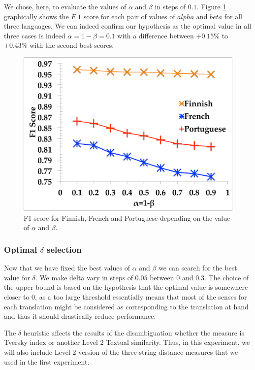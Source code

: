 \documentclass[10pt,a4paper,twoside]{article}
\begin{document}
We chose, here, to evaluate the values of \(\alpha\) and \(\beta\) in steps of \(0.1\). Figure \ref{fig.1} graphically shows the \(F\_1\) score for each pair of values of \(alpha\) and \(beta\) for all three languages. We can indeed confirm our hypothesis as the optimal value in all three cases is indeed \(\alpha=1-\beta=0.1\) with a difference between \(+0.15\%\) to \(+0.43\%\) with the second best scores.
	
\begin{figure}\centering
\includegraphics[width=0.64\columnwidth]{alphabetafig}
\caption{F1 score for Finnish, French and Portuguese depending on the value of \(\alpha\) and \(\beta\).}
\label{fig.1}
\end{figure}

\subsubsection{Optimal \(\delta\) selection}
Now that we have fixed the best values of \(\alpha\) and \(\beta\) we can search for the best value for \(\delta\). We make delta vary in steps of \(0.05\) between \(0\) and \(0.3\). The choice of the upper bound is based on the hypothesis that the optimal value is somewhere closer to 0, as a too large threshold essentially means that most of the senses for each translation might be considered as corresponding to the translation at hand and thus it should drastically reduce performance. 

The \(\delta\) heuristic affects the results of the disambiguation whether the measure is  Tversky index or another Level 2 Textual similarity. Thus, in this experiment, we will also include Level 2 version of the three string distance measures that we used in the first experiment.
\end{document}
